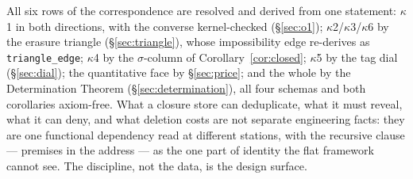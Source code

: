 \documentclass[10pt]{article}
\begin{document}
All six rows of the correspondence are resolved and derived from one statement: $\kappa$1 in both directions, with the converse kernel-checked (\S\ref{sec:o1}); $\kappa$2/$\kappa$3/$\kappa$6 by the erasure triangle (\S\ref{sec:triangle}), whose impossibility edge re-derives as \texttt{triangle\_edge}; $\kappa$4 by the $\sigma$-column of Corollary~\ref{cor:closed}; $\kappa$5 by the tag dial (\S\ref{sec:dial}); the quantitative face by \S\ref{sec:price}; and the whole by the Determination Theorem (\S\ref{sec:determination}), all four schemas and both corollaries axiom-free. What a closure store can deduplicate, what it must reveal, what it can deny, and what deletion costs are not separate engineering facts: they are one functional dependency read at different stations, with the recursive clause --- premises in the address --- as the one part of identity the flat framework cannot see. The discipline, not the data, is the design surface.
\end{document}
